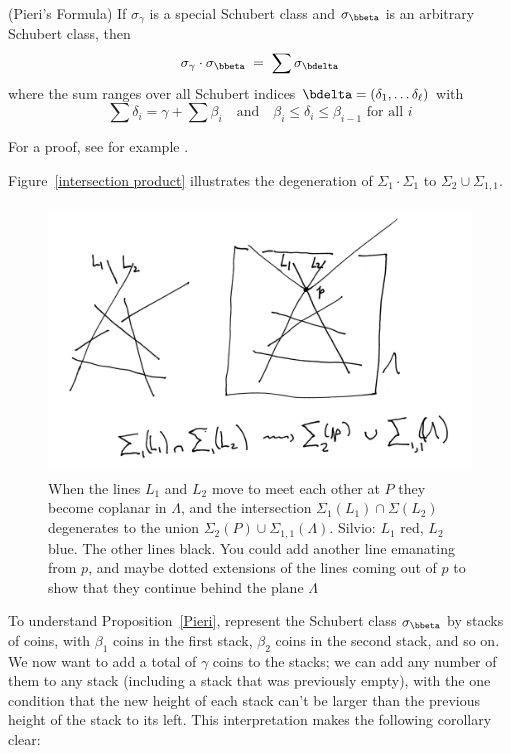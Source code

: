\begin{fact}
\begin{proposition}\label{Pieri}(Pieri's Formula)
If $\sigma_\gamma$ is a special Schubert class and $\sigma_{\bbeta}$ is an arbitrary Schubert class, then
$$
\sigma_\gamma \cdot \sigma_{\bbeta} \; = \; \sum \sigma_{\bdelta}
$$
where the sum ranges over all Schubert indices ${\bdelta} = (\delta_1, \dots \delta_{\ell})$ with
$$
\sum \delta_i = \gamma + \sum \beta_i \quad \text{and} \quad \beta_i \leq \delta_i \leq \beta_{i-1} \text{ for all } i
$$
\end{proposition}
For a proof, see for example \cite[Section 4.2.4]{3264}.
\end{fact}
Figure~\ref{intersection product} illustrates the degeneration of $\Sigma_1\cdot \Sigma_1$ to $\Sigma_2 \cup \Sigma_{1,1}$.
\begin{figure}
\inprogress
\centerline {\includegraphics[height=2.8in]{"main/Fig12-3"}}
\caption{When the lines $L_1$ and $L_2$ move to meet each other at $P$ they become coplanar in $\Lambda$,
and the intersection $\Sigma_1(L_1) \cap \Sigma(L_2)$
degenerates to the union $\Sigma_2(P) \cup \Sigma_{1,1}(\Lambda)$.
{Silvio: $L_1$ red, $L_2$ blue. The other lines black. You could add another line emanating from $p$, and maybe dotted extensions
of the lines coming out of $p$ to show that they continue behind the plane $\Lambda$ }}
\label{Schubert cycles in G(2,4).}
\end{figure}

To understand Proposition~\ref{Pieri}, represent the Schubert class $\sigma_{\bbeta}$ by stacks of coins, with $\beta_1$ coins in the first stack, $\beta_2$ coins in the second stack, and so on. We now want to add a total of $\gamma$ coins to the stacks; we can add any number of them to any stack (including a stack that was previously empty), with the one condition that the new height of each stack can't be larger than the previous height of the stack to its left. This interpretation makes the following corollary clear:

